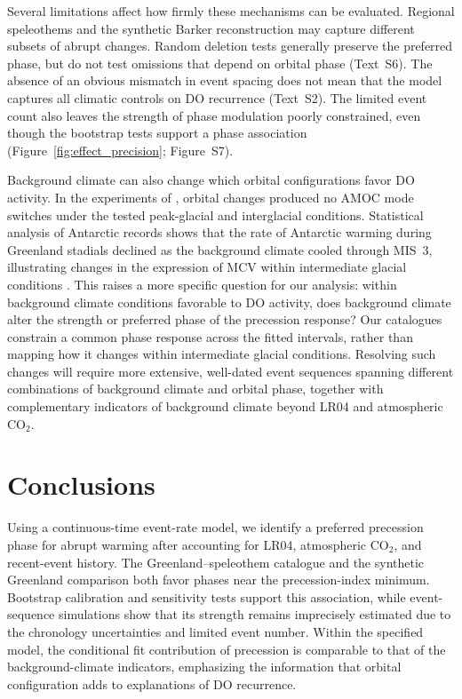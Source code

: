 \documentclass[11pt]{article}
\begin{document}
Several limitations affect how firmly these mechanisms can be evaluated. Regional speleothems and the synthetic Barker reconstruction may capture different subsets of abrupt changes. Random deletion tests generally preserve the preferred phase, but do not test omissions that depend on orbital phase (Text~S6). The absence of an obvious mismatch in event spacing does not mean that the model captures all climatic controls on DO recurrence (Text~S2). The limited event count also leaves the strength of phase modulation poorly constrained, even though the bootstrap tests support a phase association (Figure~\ref{fig:effect_precision}; Figure~S7).

Background climate can also change which orbital configurations favor DO activity. In the experiments of \citet{zhang2021direct}, orbital changes produced no AMOC mode switches under the tested peak-glacial and interglacial conditions. Statistical analysis of Antarctic records shows that the rate of Antarctic warming during Greenland stadials declined as the background climate cooled through MIS~3, illustrating changes in the expression of MCV within intermediate glacial conditions \citep{zheng2021different}. This raises a more specific question for our analysis: within background climate conditions favorable to DO activity, does background climate alter the strength or preferred phase of the precession response? Our catalogues constrain a common phase response across the fitted intervals, rather than mapping how it changes within intermediate glacial conditions. Resolving such changes will require more extensive, well-dated event sequences spanning different combinations of background climate and orbital phase, together with complementary indicators of background climate beyond LR04 and atmospheric CO$_2$.


\section{Conclusions}

Using a continuous-time event-rate model, we identify a preferred precession phase for abrupt warming after accounting for LR04, atmospheric CO$_2$, and recent-event history. The Greenland--speleothem catalogue and the synthetic Greenland comparison both favor phases near the precession-index minimum. Bootstrap calibration and sensitivity tests support this association, while event-sequence simulations show that its strength remains imprecisely estimated due to the chronology uncertainties and limited event number. Within the specified model, the conditional fit contribution of precession is comparable to that of the background-climate indicators, emphasizing the information that orbital configuration adds to explanations of DO recurrence. 
\end{document}
